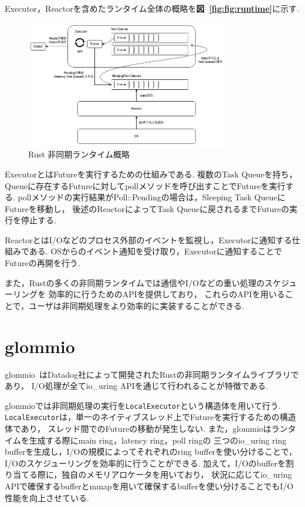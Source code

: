 \documentclass[a4paper,11pt]{jreport}
\newcommand\figref[1]{\textbf{図~\ref{fig:#1}}}
\begin{document}
Executor，Reactorを含めたランタイム全体の概略を\figref{fig:runtime}に示す.
\begin{figure}[tb]
	\centering
	\includegraphics[width=9cm, bb=0 0 800 550]{figures/rust_async.png}
	\caption{Rust 非同期ランタイム概略}
	\label{fig:runtime}
\end{figure}
ExecutorとはFutureを実行するための仕組みである.
複数のTask Queueを持ち，Queueに存在するFutureに対してpollメソッドを呼び出すことでFutureを実行する.
pollメソッドの実行結果がPoll::Pendingの場合は，Sleeping Task QueueにFutureを移動し，
後述のReactorによってTask Queueに戻されるまでFutureの実行を停止する.

ReactorとはI/Oなどのプロセス外部のイベントを監視し，Executorに通知する仕組みである.
OSからのイベント通知を受け取り，Executorに通知することでFutureの再開を行う.

また，Rustの多くの非同期ランタイムでは通信やI/Oなどの重い処理のスケジューリングを
効率的に行うためのAPIを提供しており，
これらのAPIを用いることで，ユーザは非同期処理をより効率的に実装することができる.

\section{glommio}
glommio~\cite{glommio}はDatadog社によって開発されたRustの非同期ランタイムライブラリであり，
I/O処理が全てio\_uring APIを通じて行われることが特徴である.

glommioでは非同期処理の実行を\lstinline|LocalExecutor|という構造体を用いて行う.
\lstinline|LocalExecutor|は，単一のネイティブスレッド上でFutureを実行するための構造体であり，
スレッド間でのFutureの移動が発生しない.
また，glommioはランタイムを生成する際にmain ring，latency ring，poll ringの
三つのio\_uring ring bufferを生成し，I/Oの規模によってそれぞれのring bufferを使い分けることで，
I/Oのスケジューリングを効率的に行うことができる.
加えて，I/Oのbufferを割り当てる際に，独自のメモリアロケータを用いており，
状況に応じてio\_uring APIで確保するbufferとmmapを用いて確保するbufferを使い分けることでもI/O性能を向上させている.
\end{document}
